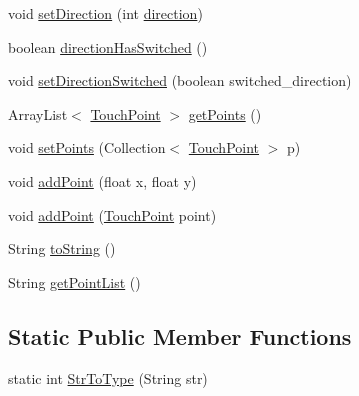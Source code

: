 \begin{DoxyCompactItemize}
\item 
void \hyperlink{classch_1_1zhaw_1_1ba10__bsha__1_1_1service_1_1MicroGesture_a2bf5f83579721d1ccfc5f36b39eb9ea9}{setDirection} (int \hyperlink{classch_1_1zhaw_1_1ba10__bsha__1_1_1service_1_1MicroGesture_af599becac7054d4356b17da8eee187b0}{direction})
\item 
boolean \hyperlink{classch_1_1zhaw_1_1ba10__bsha__1_1_1service_1_1MicroGesture_a6ac77efbcacfb83da624687c2362b2a9}{directionHasSwitched} ()
\item 
void \hyperlink{classch_1_1zhaw_1_1ba10__bsha__1_1_1service_1_1MicroGesture_ad4647452ba6cbeca4766bf81dfa0fc7d}{setDirectionSwitched} (boolean switched\_\-direction)
\item 
ArrayList$<$ \hyperlink{classch_1_1zhaw_1_1ba10__bsha__1_1_1TouchPoint}{TouchPoint} $>$ \hyperlink{classch_1_1zhaw_1_1ba10__bsha__1_1_1service_1_1MicroGesture_a919d77a82938af887cff893c7b0f41e5}{getPoints} ()
\item 
void \hyperlink{classch_1_1zhaw_1_1ba10__bsha__1_1_1service_1_1MicroGesture_a71ef1e00c42a00874e551707d73de579}{setPoints} (Collection$<$ \hyperlink{classch_1_1zhaw_1_1ba10__bsha__1_1_1TouchPoint}{TouchPoint} $>$ p)
\item 
void \hyperlink{classch_1_1zhaw_1_1ba10__bsha__1_1_1service_1_1MicroGesture_a328c48ead9f14d52e747a54a970fdd9e}{addPoint} (float x, float y)
\item 
void \hyperlink{classch_1_1zhaw_1_1ba10__bsha__1_1_1service_1_1MicroGesture_a3a553d36d664db7199804f09f08d28cf}{addPoint} (\hyperlink{classch_1_1zhaw_1_1ba10__bsha__1_1_1TouchPoint}{TouchPoint} point)
\item 
String \hyperlink{classch_1_1zhaw_1_1ba10__bsha__1_1_1service_1_1MicroGesture_adbf2189c0f8d6737493978f765e73fe0}{toString} ()
\item 
String \hyperlink{classch_1_1zhaw_1_1ba10__bsha__1_1_1service_1_1MicroGesture_a541771c10aeb3dcabe1d310a26ef1c2b}{getPointList} ()
\end{DoxyCompactItemize}
\subsection*{Static Public Member Functions}
\begin{DoxyCompactItemize}
\item 
static int \hyperlink{classch_1_1zhaw_1_1ba10__bsha__1_1_1service_1_1MicroGesture_ad0059e70f1b2eb1ec1876ece697bc871}{StrToType} (String str)
\end{DoxyCompactItemize}
